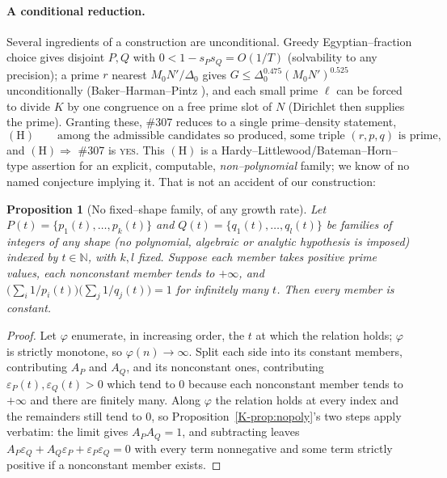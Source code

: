 \documentclass[11pt]{article}
\newtheorem{proposition}[theorem]{Proposition}
\theoremstyle{definition}
\begin{document}
\paragraph{A conditional reduction.} Several ingredients of a construction are unconditional. Greedy
Egyptian--fraction choice gives disjoint $P,Q$ with $0<1-s_Ps_Q=O(1/T)$ (solvability to any
precision); a prime $r$ nearest $M_0N'/\Delta_0$ gives $G\le\Delta_0^{0.475}(M_0N')^{0.525}$
unconditionally (Baker--Harman--Pintz \cite{BHP2001}), and each small prime $\ell$ can be forced to
divide $K$ by one congruence on a free prime slot of $N$ (Dirichlet then supplies the prime).
Granting these, \#307 reduces to a single prime--density statement,
\[
(\mathrm{H})\qquad\text{among the admissible candidates so produced, some triple $(r,p,q)$ is prime,}
\]
and $(\mathrm{H})\Rightarrow$ \#307 is \textsc{yes}. This $(\mathrm{H})$ is a
Hardy--Littlewood/Bateman--Horn--type assertion for an explicit, computable, \emph{non--polynomial}
family; we know of no named conjecture implying it. That is not an accident of our construction:

\begin{proposition}[No fixed--shape family, of any growth rate]\label{prop:nofamily}
Let $P(t)=\{p_1(t),\dots,p_k(t)\}$ and $Q(t)=\{q_1(t),\dots,q_l(t)\}$ be families of integers of
\emph{any} shape (no polynomial, algebraic or analytic hypothesis is imposed) indexed by
$t\in\mathbb{N}$, with $k,l$ fixed. Suppose each member takes positive prime values, each nonconstant
member tends to $+\infty$, and
$\bigl(\sum_i1/p_i(t)\bigr)\bigl(\sum_j1/q_j(t)\bigr)=1$ for \emph{infinitely many} $t$. Then every
member is constant.
\end{proposition}
\begin{proof}
Let $\varphi$ enumerate, in increasing order, the $t$ at which the relation holds; $\varphi$ is
strictly monotone, so $\varphi(n)\to\infty$. Split each side into its constant members, contributing
$A_P$ and $A_Q$, and its nonconstant ones, contributing $\varepsilon_P(t),\varepsilon_Q(t)>0$ which
tend to $0$ because each nonconstant member tends to $+\infty$ and there are finitely many. Along
$\varphi$ the relation holds at every index and the remainders still tend to $0$, so
Proposition~\ref{K-prop:nopoly}'s two steps apply verbatim: the limit gives $A_PA_Q=1$, and subtracting
leaves $A_P\varepsilon_Q+A_Q\varepsilon_P+\varepsilon_P\varepsilon_Q=0$ with every term nonnegative
and some term strictly positive if a nonconstant member exists.
\end{proof}
\end{document}
